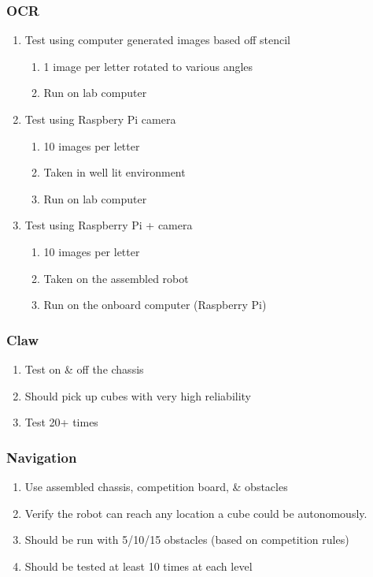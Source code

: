 \documentclass[12pt]{article}
\begin{document}
\subsubsection{OCR}
	\begin{enumerate}[noitemsep]
		\item Test using computer generated images based off stencil
		\begin{enumerate}[noitemsep]
			\item 1 image per letter rotated to various angles
			\item Run on lab computer
		\end{enumerate}
		\item Test using Raspbery Pi camera
		\begin{enumerate}[noitemsep]
			\item 10 images per letter
			\item Taken in well lit environment
			\item Run on lab computer
		\end{enumerate}
		\item Test using Raspberry Pi + camera
		\begin{enumerate}[noitemsep]
			\item 10 images per letter
			\item Taken on the assembled robot
			\item Run on the onboard computer (Raspberry Pi)
		\end{enumerate}
	\end{enumerate}
\subsubsection{Claw}
	\begin{enumerate}[noitemsep]
		\item Test on \& off the chassis
		\item Should pick up cubes with very high reliability
		\item Test 20+ times
	\end{enumerate}
\subsubsection{Navigation}
	\begin{enumerate}[noitemsep]
		\item Use assembled chassis, competition board, \& obstacles
		\item Verify the robot can reach any location a cube could be autonomously.
		\item Should be run with 5/10/15 obstacles (based on competition rules)
		\item Should be tested at least 10 times at each level
	\end{enumerate}
\end{document}
